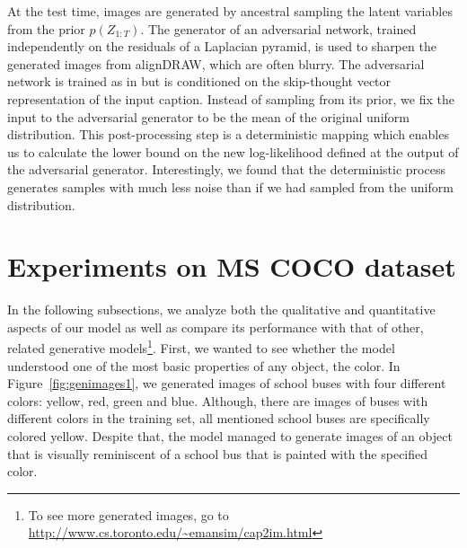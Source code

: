 \documentclass{article} %
\newcommand{\comm}[1]{}
\newcommand{\Lat}{Z}
\newcommand{\prior}{p}
\begin{document}
At the test time, images are generated by ancestral sampling the latent variables from the prior $\prior(\Lat_{1:T})$. 
The generator of an adversarial network, trained independently on the residuals of a Laplacian pyramid, is used to sharpen the generated images from alignDRAW, which are often blurry. The adversarial network is trained as in \citep{denton_lapgan} but is conditioned on the skip-thought vector representation \cite{skip-thought} of the input caption.
Instead of sampling from its prior, we fix the input to the adversarial generator to be the mean of the original uniform distribution. This post-processing step is a deterministic mapping which enables us to calculate the lower bound on the new log-likelihood defined at the output of the adversarial generator. Interestingly, we found that the deterministic process generates samples with much less noise than if we had sampled from the uniform distribution.

\comm{. The reconstruction loss becomes the loss between sharpened image and correct image, whereas the latent loss stays the same. We also noticed that inputting the mean of the uniform distribution into the edge generator network allowed us to generate samples with much less noise than if we had sampled from the uniform distribution.  }

\vspace{-0.2cm}
\section{Experiments on MS COCO dataset}

In the following subsections, we analyze both the qualitative and quantitative aspects of our model as well as compare its performance with that of other, related generative models\footnote{To see more generated images, go to \url{http://www.cs.toronto.edu/~emansim/cap2im.html}}.
First, we wanted to see whether the model understood one of the most basic properties of any object, the color. In Figure~\ref{fig:genimages1}, we generated images of school buses with four different colors: yellow, red, green and blue. Although, there are images of buses with different colors in the training set, all mentioned school buses are specifically colored yellow. Despite that, the model managed to generate images of an object that is visually reminiscent of a school bus that is painted with the specified color.
\end{document}
